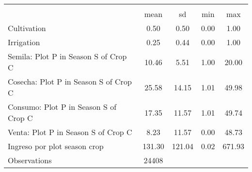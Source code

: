 {
\def\sym#1{\ifmmode^{#1}\else\(^{#1}\)\fi}
\begin{tabular}{l*{1}{cccc}}
\hline\hline
                    &\multicolumn{4}{c}{}                               \\
                    &        mean&          sd&         min&         max\\
\hline
Cultivation         &        0.50&        0.50&        0.00&        1.00\\
Irrigation          &        0.25&        0.44&        0.00&        1.00\\
Semila: Plot P in Season S of Crop C&       10.46&        5.51&        1.00&       20.00\\
Cosecha: Plot P in Season S of Crop C&       25.58&       14.15&        1.01&       49.98\\
Consumo: Plot P in Season S of Crop C&       17.35&       11.57&        1.01&       49.74\\
Venta: Plot P in Season S of Crop C&        8.23&       11.57&        0.00&       48.73\\
Ingreso por plot season crop&      131.30&      121.04&        0.02&      671.93\\
\hline
Observations        &       24408&            &            &            \\
\hline\hline
\end{tabular}
}
